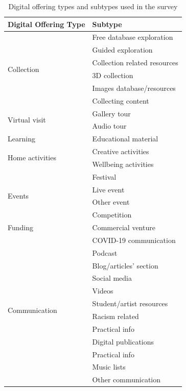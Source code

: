 \documentclass{egpubl}
\begin{document}
\begin{table}
\small                    %
\setlength\tabcolsep{4pt} %
\centering

\begin{tabular}{
	| l | l |}


    \hline
    \textbf{Digital Offering Type}  & \textbf{Subtype}  \\
    \hline
  \multirow{6}{*}{Collection} & Free database exploration  \\
&  Guided exploration  \\
&  Collection related resources \\
&  3D collection \\
&  Images database/resources \\
&  Collecting content \\
    \hline
 \multirow{2}{*}{Virtual visit} & Gallery tour  \\
&  Audio tour  \\
    \hline
 Learning & Educational material  \\
    \hline
 \multirow{2}{*}{Home activities} & Creative activities \\
&  Wellbeing activities  \\
    \hline
 \multirow{4}{*}{Events} & Festival\\
&  Live event \\
&  Other event\\
&  Competition \\
    \hline
 Funding & Commercial venture \\
    \hline
 \multirow{12}{*}{Communication} & COVID-19 communication \\
& Podcast \\
& Blog/articles' section \\
& Social media  \\
& Videos \\
& Student/artist resources \\
& Racism related \\
& Practical info \\
& Digital publications \\
& Practical info \\
& Music lists \\
& Other communication\\
    \hline
\end{tabular}
\caption{\label{tab:digoffer}Digital offering types and subtypes used in the survey}
\end{table}
\normalsize
\end{document}

